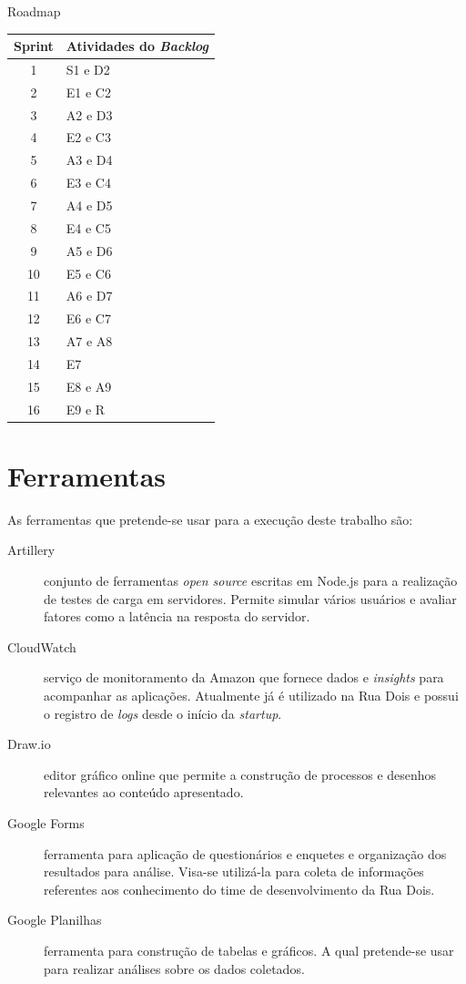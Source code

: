 \begin{quadro}
    \caption{Roadmap\label{quad:Roadmap}}
    \begin{tabular}{ | c | l | }
    \hline
    \textbf{Sprint} &
        \textbf{Atividades do \textit{Backlog}} \\ \hline
        1 & S1 e D2 \\ \hline
        2 & E1 e C2 \\ \hline
        3 & A2 e D3 \\ \hline
        4 & E2 e C3 \\ \hline
        5 & A3 e D4 \\ \hline
        6 & E3 e C4 \\ \hline
        7 & A4 e D5 \\ \hline
        8 & E4 e C5 \\ \hline
        9 & A5 e D6 \\ \hline
        10 & E5 e C6 \\ \hline
        11 & A6 e D7 \\ \hline
        12 & E6 e C7 \\ \hline
        13 & A7 e A8 \\ \hline
        14 & E7 \\ \hline
        15 & E8 e A9 \\ \hline
        16 & E9 e R \\ \hline
    \end{tabular}
\end{quadro}

\section{Ferramentas}

As ferramentas que pretende-se usar para a execução deste trabalho são:

\begin{description}
    \item[Artillery] conjunto de ferramentas \textit{open source} escritas em Node.js
    para a realização de testes de carga em servidores. Permite simular vários usuários
    e avaliar fatores como a latência na resposta do servidor.
    \item[CloudWatch] serviço de monitoramento da Amazon que fornece dados e
    \textit{insights} para acompanhar as aplicações. Atualmente já é utilizado na
    Rua Dois e possui o registro de \textit{logs} desde o início da \textit{startup}.
    \item[Draw.io] editor gráfico online que permite a construção de processos e
    desenhos relevantes ao conteúdo apresentado.
    \item[Google Forms] ferramenta para aplicação de questionários e enquetes
    e organização dos resultados para análise. Visa-se utilizá-la para coleta
    de informações referentes aos conhecimento do time de desenvolvimento da Rua Dois.
    \item[Google Planilhas] ferramenta para construção de tabelas e gráficos.
    A qual pretende-se usar para realizar análises sobre os dados coletados.
\end{description}


